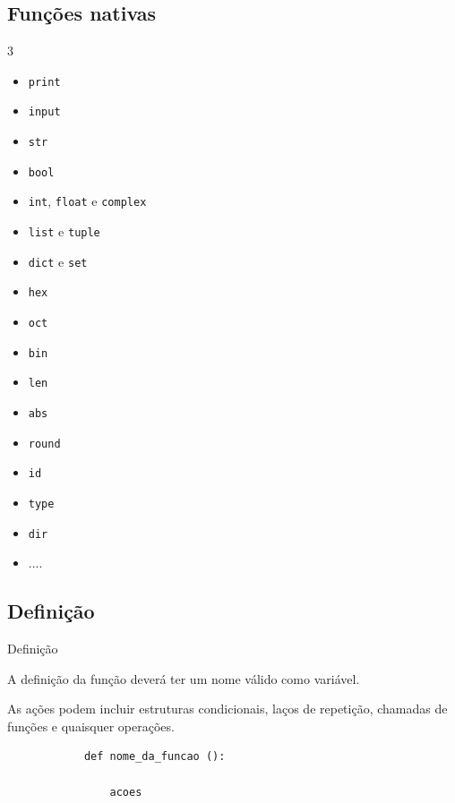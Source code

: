 	\subsection{Funções nativas}
	\begin{frame}
	\begin{multicols}{3}
	
		\begin{itemize}
			\item \texttt{print} 
			\item \texttt{input}	
			
		\vfill 
			
			\item \texttt{str}	
			\item \texttt{bool} 
			\item \texttt{int}, \texttt{float} e \texttt{complex} 
			\item \texttt{list} e \texttt{tuple}
			\item \texttt{dict} e \texttt{set}
	
		\vfill
	
			\item \texttt{hex}
			\item \texttt{oct}
			\item \texttt{bin}
		
		\vfill 	
		
			\item \texttt{len}		
			\item \texttt{abs}
			\item \texttt{round}

		\vfill 
	
			\item \texttt{id}

				
			\item \texttt{type}
			\item \texttt{dir}
			
		\vfill	
			
			\item ....
	
		\end{itemize}
	\end{multicols}
	\end{frame}
	
	\subsection{Definição}
	
	\begin{frame}[containsverbatim]{Definição}

		A definição da função deverá ter um nome válido como variável.
		
		As ações podem incluir estruturas condicionais, laços de repetição, chamadas de funções e quaisquer operações. 

		\begin{verbatim}
			def nome_da_funcao ():
				
				acoes
		\end{verbatim}

	\end{frame}
	
